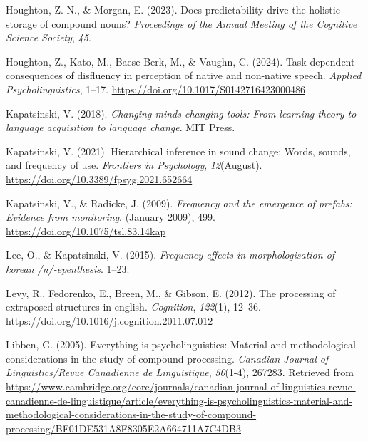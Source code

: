 \documentclass[
  man,floatsintext]{apa6}
\newlength{\cslhangindent}
\newlength{\cslentryspacingunit} %
\newenvironment{CSLReferences}[2] %
 {%
  \setlength{\parindent}{0pt}
  \ifodd #1
  \let\oldpar\par
  \def\par{\hangindent=\cslhangindent\oldpar}
  \fi
  \setlength{\parskip}{#2\cslentryspacingunit}
 }%
 {}
\begin{document}
\begin{CSLReferences}{1}{0}
\leavevmode{}%
Houghton, Z. N., \& Morgan, E. (2023). Does predictability drive the holistic storage of compound nouns? \emph{Proceedings of the Annual Meeting of the Cognitive Science Society}, \emph{45}.

\leavevmode{}%
Houghton, Z., Kato, M., Baese-Berk, M., \& Vaughn, C. (2024). Task-dependent consequences of disfluency in perception of native and non-native speech. \emph{Applied Psycholinguistics}, 1--17. \url{https://doi.org/10.1017/S0142716423000486}

\leavevmode{}%
Kapatsinski, V. (2018). \emph{Changing minds changing tools: From learning theory to language acquisition to language change}. MIT Press.

\leavevmode{}%
Kapatsinski, V. (2021). Hierarchical inference in sound change: Words, sounds, and frequency of use. \emph{Frontiers in Psychology}, \emph{12}(August). \url{https://doi.org/10.3389/fpsyg.2021.652664}

\leavevmode{}%
Kapatsinski, V., \& Radicke, J. (2009). \emph{Frequency and the emergence of prefabs: Evidence from monitoring}. (January 2009), 499. \url{https://doi.org/10.1075/tsl.83.14kap}

\leavevmode{}%
Lee, O., \& Kapatsinski, V. (2015). \emph{Frequency effects in morphologisation of korean /n/-epenthesis}. 1--23.

\leavevmode{}%
Levy, R., Fedorenko, E., Breen, M., \& Gibson, E. (2012). The processing of extraposed structures in english. \emph{Cognition}, \emph{122}(1), 12--36. \url{https://doi.org/10.1016/j.cognition.2011.07.012}

\leavevmode{}%
Libben, G. (2005). Everything is psycholinguistics: Material and methodological considerations in the study of compound processing. \emph{Canadian Journal of Linguistics/Revue Canadienne de Linguistique}, \emph{50}(1-4), 267283. Retrieved from \url{https://www.cambridge.org/core/journals/canadian-journal-of-linguistics-revue-canadienne-de-linguistique/article/everything-is-psycholinguistics-material-and-methodological-considerations-in-the-study-of-compound-processing/BF01DE531A8F8305E2A664711A7C4DB3}


\end{CSLReferences}
\end{document}
